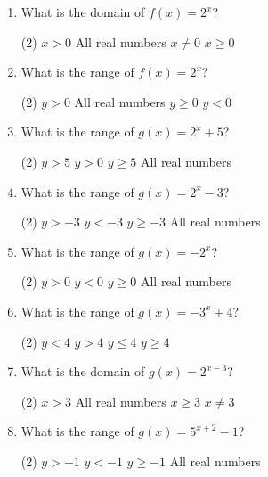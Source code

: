 \documentclass[11pt]{article}
\begin{document}
\begin{enumerate}[leftmargin=1.5em, itemsep=10pt]

\item What is the domain of $f(x) = 2^x$?
\begin{tasks}(2)
  \task $x > 0$
  \task All real numbers
  \task $x \neq 0$
  \task $x \geq 0$
\end{tasks}

\item What is the range of $f(x) = 2^x$?
\begin{tasks}(2)
  \task $y > 0$
  \task All real numbers
  \task $y \geq 0$
  \task $y < 0$
\end{tasks}

\item What is the range of $g(x) = 2^x + 5$?
\begin{tasks}(2)
  \task $y > 5$
  \task $y > 0$
  \task $y \geq 5$
  \task All real numbers
\end{tasks}

\item What is the range of $g(x) = 2^x - 3$?
\begin{tasks}(2)
  \task $y > -3$
  \task $y < -3$
  \task $y \geq -3$
  \task All real numbers
\end{tasks}

\item What is the range of $g(x) = -2^x$?
\begin{tasks}(2)
  \task $y > 0$
  \task $y < 0$
  \task $y \geq 0$
  \task All real numbers
\end{tasks}

\item What is the range of $g(x) = -3^x + 4$?
\begin{tasks}(2)
  \task $y < 4$
  \task $y > 4$
  \task $y \leq 4$
  \task $y \geq 4$
\end{tasks}

\item What is the domain of $g(x) = 2^{x-3}$?
\begin{tasks}(2)
  \task $x > 3$
  \task All real numbers
  \task $x \geq 3$
  \task $x \neq 3$
\end{tasks}

\item What is the range of $g(x) = 5^{x+2} - 1$?
\begin{tasks}(2)
  \task $y > -1$
  \task $y < -1$
  \task $y \geq -1$
  \task All real numbers
\end{tasks}


\end{enumerate}
\end{document}
